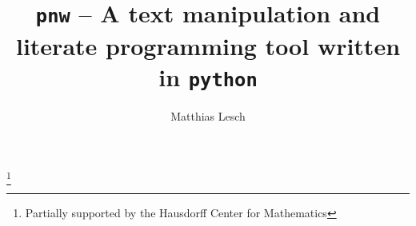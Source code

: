 \documentclass[neutral,proc,reqno]{ml-gen}
\begin{document}
\lstset{%
language=Python,
basicstyle=\small,
columns=fullflexible}

\title[\texttt{pnw}]{\texttt{pnw} -- A text manipulation and literate
programming tool written in \texttt{python}}

\author{Matthias Lesch}
\address{Mathematisches Institut,
Universit\"at Bonn,
Endenicher Allee 60,
53115 Bonn,
Germany}

%
\thanks{Partially supported by the 
        Hausdorff Center for Mathematics}


\end{document}
